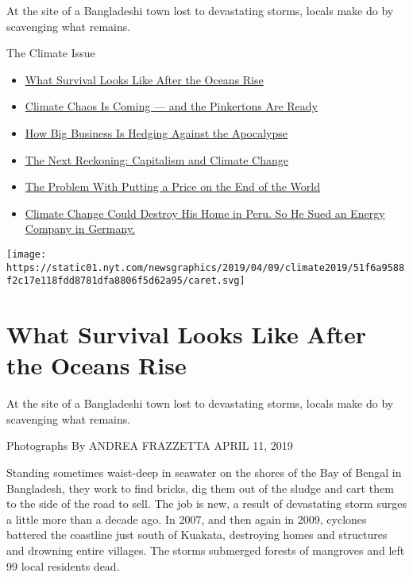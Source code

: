 At the site of a Bangladeshi town lost to devastating storms, locals
make do by scavenging what remains.

The Climate Issue

\begin{itemize}
\tightlist
\item
  \href{https://www.nytimes.com/interactive/2019/04/11/magazine/climate-change-bangladesh-scavenging.html}{What
  Survival Looks Like After the Oceans Rise}
\item
  \href{https://www.nytimes.com/interactive/2019/04/10/magazine/climate-change-pinkertons.html}{Climate
  Chaos Is Coming --- and the Pinkertons Are Ready}
\item
  \href{https://www.nytimes.com/interactive/2019/04/11/magazine/climate-change-exxon-renewable-energy.html}{How
  Big Business Is Hedging Against the Apocalypse}
\item
  \href{https://www.nytimes.com/interactive/2019/04/09/magazine/climate-change-capitalism.html}{The
  Next Reckoning: Capitalism and Climate Change}
\item
  \href{https://www.nytimes.com/interactive/2019/04/09/magazine/climate-change-politics-economics.html}{The
  Problem With Putting a Price on the End of the World}
\item
  \href{https://www.nytimes.com/interactive/2019/04/09/magazine/climate-change-peru-law.html}{Climate
  Change Could Destroy His Home in Peru. So He Sued an Energy Company in
  Germany.}
\end{itemize}

\protect\hyperlink{}{} \protect\hyperlink{}{}

\texttt{[image: https://static01.nyt.com/newsgraphics/2019/04/09/climate2019/51f6a9588f2c17e118fdd8781dfa8806f5d62a95/caret.svg]}

\hypertarget{what-survival-looks-like-after-the-oceans-rise-1}{%
\section{What Survival Looks Like After the Oceans
Rise}\label{what-survival-looks-like-after-the-oceans-rise-1}}

At the site of a Bangladeshi town lost to devastating storms, locals
make do by scavenging what remains.

Photographs By ANDREA FRAZZETTA APRIL 11, 2019

Standing sometimes waist-deep in seawater on the shores of the Bay of
Bengal in Bangladesh, they work to find bricks, dig them out of the
sludge and cart them to the side of the road to sell. The job is new, a
result of devastating storm surges a little more than a decade ago. In
2007, and then again in 2009, cyclones battered the coastline just south
of Kuakata, destroying homes and structures and drowning entire
villages. The storms submerged forests of mangroves and left 99 local
residents dead.

